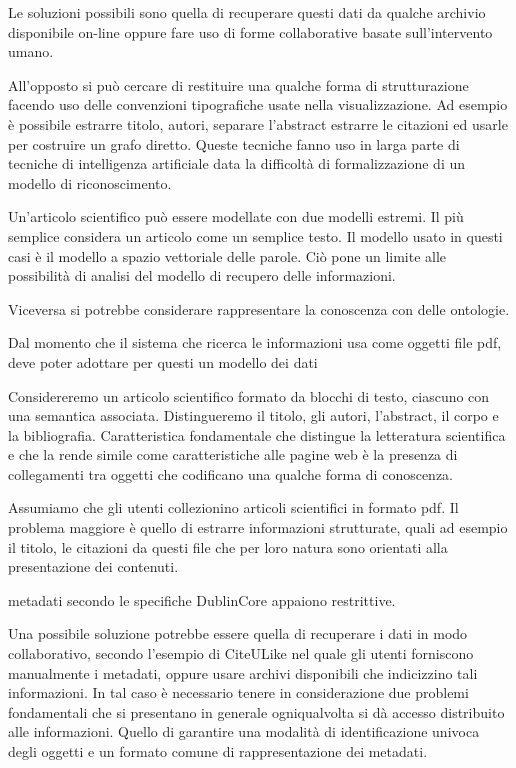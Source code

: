 Le soluzioni possibili sono quella di recuperare questi dati da qualche archivio disponibile on-line oppure fare uso di forme collaborative basate sull'intervento umano.

All'opposto si può cercare di restituire una qualche forma di strutturazione facendo uso delle convenzioni tipografiche usate nella visualizzazione. Ad esempio è possibile estrarre titolo, autori, separare l'abstract estrarre le citazioni ed usarle per costruire un grafo diretto. Queste tecniche fanno uso in larga parte di tecniche di intelligenza artificiale data la difficoltà di formalizzazione di un modello di riconoscimento.



Un'articolo scientifico può essere modellate con due modelli estremi. Il più semplice considera un articolo come un semplice testo. Il modello usato in questi casi è il modello a spazio vettoriale delle parole. Ciò pone un limite alle possibilità di analisi del modello di recupero delle informazioni.

Viceversa si potrebbe considerare rappresentare la conoscenza con delle ontologie.

Dal momento che il sistema che ricerca le informazioni usa come oggetti file pdf, deve poter adottare per questi un modello dei dati

Considereremo un articolo scientifico formato da blocchi di testo, ciascuno con una semantica associata. Distingueremo il titolo, gli autori, l'abstract, il corpo e la bibliografia. Caratteristica fondamentale che distingue la letteratura scientifica e che la rende simile come caratteristiche alle pagine web è la presenza di collegamenti tra oggetti che codificano una qualche forma di conoscenza.

Assumiamo che gli utenti collezionino articoli scientifici in formato pdf. Il problema maggiore è quello di estrarre informazioni strutturate, quali ad esempio il titolo, le citazioni da questi file che per loro natura sono orientati alla presentazione dei contenuti.

metadati secondo le specifiche DublinCore appaiono restrittive.

Una possibile soluzione potrebbe essere quella di recuperare i dati in modo collaborativo, secondo l'esempio di CiteULike nel quale gli utenti forniscono manualmente i metadati, oppure usare archivi disponibili che indicizzino tali informazioni. In tal caso è necessario tenere in considerazione due problemi fondamentali che si presentano in generale ogniqualvolta si dà accesso distribuito alle informazioni. Quello di garantire una modalità di identificazione univoca degli oggetti e un formato comune di rappresentazione dei metadati.

